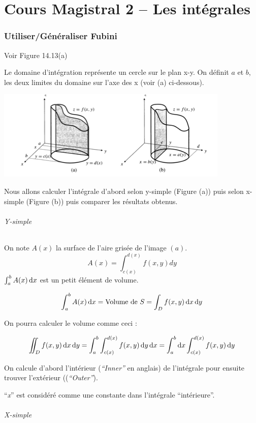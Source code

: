 \part{Cours Magistral 2 -- Les intégrales}
\section{Utiliser/Généraliser Fubini}
Voir Figure 14.13(a)

Le domaine d'intégration représente un cercle sur le plan x-y. On définit $a$ et $b$, les deux limites du domaine sur l'axe des x (voir (a) ci-dessous).

\includegraphics[scale=0.8]{image1.png}

Nous allons calculer l'intégrale d'abord selon y-simple (Figure (a)) puis selon x-simple (Figure (b)) puis comparer les résultats obtenus.
\paragraph{Y-simple}
On note $A(x)$ la surface de l'aire grisée de l'image $(a)$.
\[A(x)=\int_{c(x)}^{d(x)}f(x,y)dy\]
$\int_a^b A(x) \operatorname{d}\! x$ est un petit élément de volume.

\[\int_a^b A(x) \operatorname{d}\! x = \text{Volume de }S = \int_Df(x,y) \operatorname{d}\! x \operatorname{d}\! y\]

On pourra calculer le volume comme ceci :

\[ \iint_D f(x,y) \operatorname{d}\! x \operatorname{d}\! y = \int_a^b \int_{c(x)}^{d(x)} f(x,y)  \operatorname{d}\! y \operatorname{d}\! x = \int_a^b \operatorname{d}\! x \int_{c(x)}^{d(x)} f(x,y) \operatorname{d}\! y \]

On calcule d'abord l'intérieur (\textit{``Inner''} en anglais) de l'intégrale pour ensuite trouver l'extérieur ((\textit{``Outer''}).
\begin{myrem}
``\emph{x}'' est considéré comme une constante dans l'intégrale ``intérieure''.
\end{myrem}

\paragraph{X-simple}

